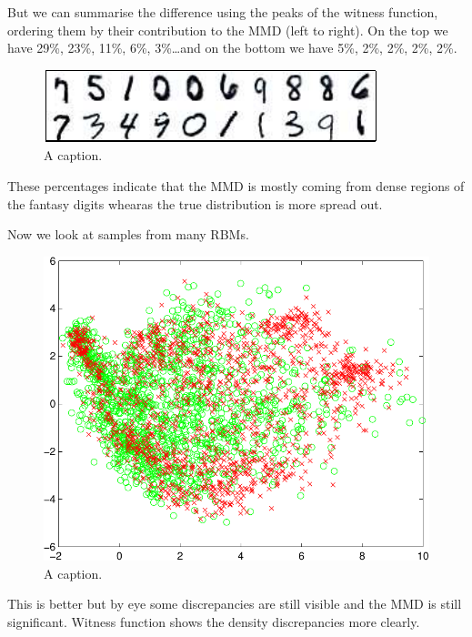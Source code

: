 \documentclass{article} %
\begin{document}
But we can summarise the difference using the peaks of the witness function, ordering them by their contribution to the MMD (left to right).
On the top we have 29\%, 23\%, 11\%, 6\%, 3\%\ldots and on the bottom we have 5\%, 2\%, 2\%, 2\%, 2\%.

\begin{figure}[ht]
\centering
\includegraphics[width=0.98\columnwidth]{figures/rbm_witness_peaks}
\caption{
A caption.
}
\label{fig:rbm_witness_peaks}
\end{figure}

These percentages indicate that the MMD is mostly coming from dense regions of the fantasy digits whearas the true distribution is more spread out.

Now we look at samples from many RBMs.

\begin{figure}[ht]
\centering
\includegraphics[width=0.98\columnwidth]{figures/many_rbm_pca}
\caption{
A caption.
}
\label{fig:many_rbm_pca}
\end{figure}

This is better but by eye some discrepancies are still visible and the MMD is still significant.
Witness function shows the density discrepancies more clearly.
\end{document}
